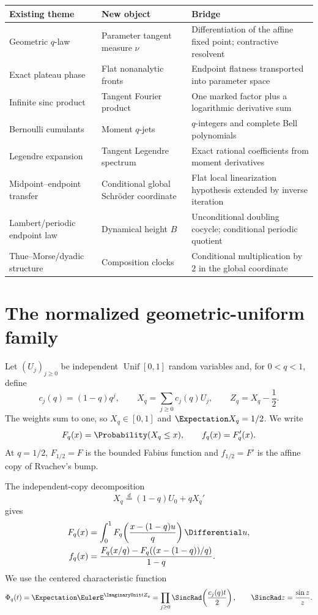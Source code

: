 \documentclass[11pt,oneside]{article}
\theoremstyle{definition}
\theoremstyle{remark}
\begin{document}
\begin{center}
\begin{tabularx}{0.96\textwidth}{@{}>{\raggedright\arraybackslash}p{}X X@{}}
\toprule
Existing theme & New object & Bridge \tabularnewline
\midrule
Geometric \(q\)-law & Parameter tangent measure \(\nu\) & Differentiation of the affine fixed point; contractive resolvent \tabularnewline
Exact plateau phase & Flat nonanalytic fronts & Endpoint flatness transported into parameter space \tabularnewline
Infinite sinc product & Tangent Fourier product & One marked factor plus a logarithmic derivative sum \tabularnewline
Bernoulli cumulants & Moment \(q\)-jets & \(q\)-integers and complete Bell polynomials \tabularnewline
Legendre expansion & Tangent Legendre spectrum & Exact rational coefficients from moment derivatives \tabularnewline
Midpoint--endpoint transfer & Conditional global Schr\"oder coordinate & Flat local linearization hypothesis extended by inverse iteration \tabularnewline
Lambert/periodic endpoint law & Dynamical height \(B\) & Unconditional doubling cocycle; conditional periodic quotient \tabularnewline
Thue--Morse/dyadic structure & Composition clocks & Conditional multiplication by \(2\) in the global coordinate \tabularnewline
\bottomrule
\end{tabularx}
\end{center}

\section{The normalized geometric-uniform family}
\label{sec:qfamily}

Let \((U_j)_{j\ge0}\) be independent \(\operatorname{Unif}[0,1]\) random variables and, for
\(0<q<1\), define
\begin{equation}
 c_j(q)=(1-q)q^j,
 \qquad
 X_q=\sum_{j\ge0}c_j(q)U_j,
 \qquad
 Z_q=X_q-\frac12.
 \label{eq:q-law}
\end{equation}
The weights sum to one, so \(X_q\in[0,1]\) and \(\Expectation X_q=1/2\).  We write
\[
 F_q(x)=\Probability(X_q\le x),\qquad f_q(x)=F_q'(x).
\]
At \(q=1/2\), \(F_{1/2}=F\) is the bounded Fabius function and \(f_{1/2}=F'\) is the affine
copy of Rvachev's bump.

The independent-copy decomposition
\begin{equation}
 X_q\overset d=(1-q)U_0+qX_q'
 \label{eq:affine-copy}
\end{equation}
gives
\begin{align}
 F_q(x)
 &=\int_0^1F_q\!\left(\frac{x-(1-q)u}{q}\right)\Differential u,
 \label{eq:q-cdf-integral}\\
 f_q(x)
 &=\frac{F_q(x/q)-F_q((x-(1-q))/q)}{1-q}.
 \label{eq:q-density-difference}
\end{align}
We use the centered characteristic function
\begin{equation}
 \Phi_q(t)=\Expectation\EulerE^{\ImaginaryUnit tZ_q}
 =\prod_{j\ge0}\SincRad\!\left(\frac{c_j(q)t}{2}\right),
 \qquad \SincRad z=\frac{\sin z}{z}.
 \label{eq:centered-sinc-product}
\end{equation}
\end{document}

